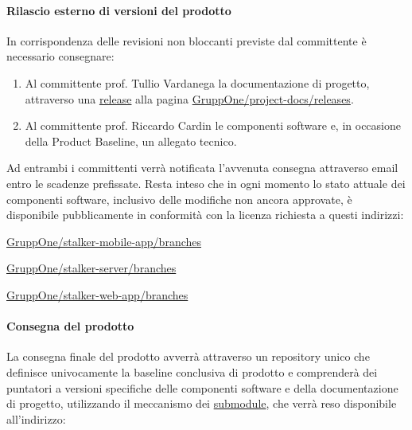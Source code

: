\documentclass[../../norme-di-progetto.tex]{subfiles}
\begin{document}

\paragraph{Rilascio esterno di versioni del prodotto}%
\label{par:rilascio_esterno_di_versioni_del_prodotto}

In corrispondenza delle revisioni non bloccanti previste dal committente è necessario consegnare:

\begin{enumerate}
  \item Al committente prof. Tullio Vardanega la documentazione di progetto, attraverso una \href{https://help.github.com/en/enterprise/2.16/user/github/administering-a-repository/about-releases}{release} alla pagina \href{https://github.com/GruppOne/project-docs/releases}{GruppOne/project-docs/releases}.
  \item Al committente prof. Riccardo Cardin le componenti software e, in occasione della Product Baseline, un allegato tecnico.
\end{enumerate}

Ad entrambi i committenti verrà notificata l'avvenuta consegna attraverso email entro le scadenze prefissate.
Resta inteso che in ogni momento lo stato attuale dei componenti software, inclusivo delle modifiche non ancora approvate, è disponibile pubblicamente in conformità con la licenza richiesta a questi indirizzi:

\begin{description}
  \item \href{https://github.com/GruppOne/stalker-mobile-app/branches}{GruppOne/stalker-mobile-app/branches}
  \item \href{https://github.com/GruppOne/stalker-server/branches}{GruppOne/stalker-server/branches}
  \item \href{https://github.com/GruppOne/stalker-web-app/branches}{GruppOne/stalker-web-app/branches}
\end{description}


\paragraph{Consegna del prodotto}%
\label{par:consegna_del_prodotto}

La consegna finale del prodotto avverrà attraverso un repository unico che definisce univocamente la baseline conclusiva di prodotto e comprenderà dei puntatori a versioni specifiche delle componenti software e della documentazione di progetto, utilizzando il meccanismo dei \href{https://git-scm.com/book/en/v2/Git-Tools-Submodules}{submodule}, che verrà reso disponibile all'indirizzo:
\end{document}
